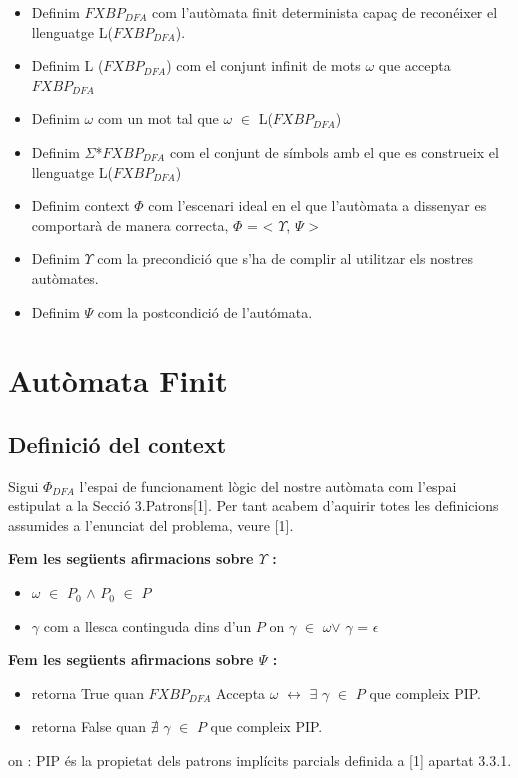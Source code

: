 \documentclass[12pt,a4paper]{report}
\def \w{$\omega$}
\def \dfa{$FXBP_{DFA} $}
\def \alphabetDFA{$\Sigma$*\dfa}
\def \context{$\Phi$}
\def \contextDFA{$\Phi_{DFA}$}
\def \pre{$\Upsilon$}
\def \post{$\Psi$}
\def \llesca{$\gamma$}
\begin{document}
\begin{itemize}
\item Definim \dfa{} com l’autòmata finit determinista capaç de reconéixer el llenguatge L(\dfa{}).
\item Definim L (\dfa{}) com el conjunt infinit de mots \w{} que accepta \dfa{}
\item Definim \w{} com un mot tal que \w{} $\in$ L(\dfa{})
\item Definim \alphabetDFA{} com el conjunt de símbols amb el que es construeix el llenguatge L(\dfa{})
\item Definim context \context{} com l’escenari ideal en el que l’autòmata a dissenyar es comportarà de manera correcta, \context{} = < \pre{}, \post{} >  
\item Definim \pre{} com la precondició que s'ha de complir al utilitzar els nostres autòmates. 
\item Definim \post{} com la postcondició de l'autómata.
\end{itemize}

\chapter{Autòmata Finit}

\section{Definició del context}

Sigui \contextDFA{} l'espai de funcionament lògic del nostre autòmata com l'espai estipulat a la Secció 3.Patrons[1]. Per tant acabem d'aquirir totes les definicions assumides a l'enunciat del problema, veure [1].

\textbf{Fem les següents afirmacions sobre \pre{} :}
\begin{itemize}
\item \w{} $\in$ $P_0$ $\wedge$ $P_0$ $\in$ $P$
\item \llesca{} com a llesca continguda dins d'un $P$ on \llesca{} $\in$ \w $\vee$ \llesca{} = $\epsilon$
\end{itemize}

\textbf{Fem les següents afirmacions sobre \post{} :}
\begin{itemize}
\item retorna True quan \dfa{} Accepta \w{} $\leftrightarrow$ $\exists$ \llesca{} $\in$ $P$ que compleix PIP.
\item retorna False quan $\nexists$ \llesca{} $\in$ $P$ que compleix PIP. 
\end{itemize}
on : PIP és la propietat dels patrons implícits parcials definida a [1] apartat 3.3.1. 
\end{document}
